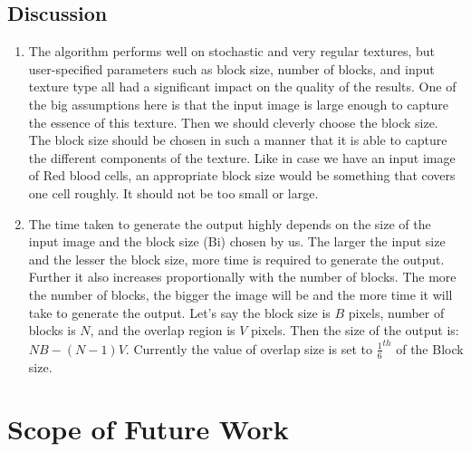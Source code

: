 \documentclass[12pt,a4paper]{report}
\begin{document}
\section{Discussion}
\begin{enumerate}
  \item The algorithm performs well on stochastic and very regular textures, but user-specified parameters such as block size, number of blocks, and input texture type all had a significant impact on the quality of the results. One of the big assumptions here is that the input image is large enough to capture the essence of this texture. Then we should cleverly choose the block size. The block size should be chosen in such a manner that it is able to capture the different components of the texture. Like in case we have an input image of Red blood cells, an appropriate block size would be something that covers one cell roughly. It should not be too small or large.
  \item The time taken to generate the output highly depends on the size of the input image and the block size (Bi) chosen by us. The larger the input size and the lesser the block size, more time is required to generate the output. Further it also increases proportionally with the number of blocks. The more the number of blocks, the bigger the image will be and the more time it will take to generate the output. Let's say the block size is $B$ pixels, number of blocks is $N$, and the overlap region is $V$ pixels. Then the size of the output is: $NB - (N-1)V$. Currently the value of overlap size is set to $\frac{1}{6}^{th}$ of the Block size.
\end{enumerate}


\chapter{Scope of Future Work}

\end{document}
